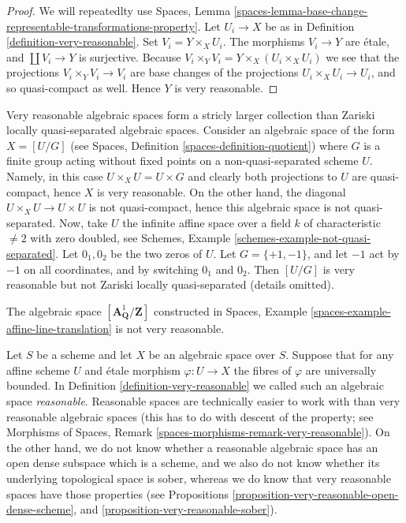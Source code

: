 \begin{proof}
We will repeatedlty use
Spaces, Lemma
\ref{spaces-lemma-base-change-representable-transformations-property}.
Let $U_i \to X$ be as in Definition \ref{definition-very-reasonable}.
Set $V_i = Y \times_X U_i$. The morphisms $V_i \to Y$ are \'etale,
and $\coprod V_i \to Y$ is surjective. Because
$V_i \times_Y V_i = Y \times_X (U_i \times_X U_i)$ we see
that the projections $V_i \times_Y V_i \to V_i$ are
base changes of the projections $U_i \times_X U_i \to U_i$, and so
quasi-compact as well. Hence $Y$ is very reasonable.
\end{proof}

\begin{remark}
\label{remark-very-reasonable-Zariski-locally-quasi-separated}
Very reasonable algebraic spaces form a stricly larger collection than
Zariski locally quasi-separated algebraic spaces. Consider
an algebraic space of the form $X = [U/G]$ (see
Spaces, Definition \ref{spaces-definition-quotient})
where $G$ is a finite group acting without fixed points on a
non-quasi-separated scheme $U$. Namely, in this case
$U \times_X U = U \times G$ and clearly both projections to $U$ are
quasi-compact, hence $X$ is very reasonable. On the other hand, the diagonal
$U \times_X U \to U \times U$ is not quasi-compact, hence this
algebraic space is not quasi-separated. Now, take $U$ the infinite
affine space over a field $k$ of characteristic $\not = 2$ with
zero doubled, see
Schemes, Example \ref{schemes-example-not-quasi-separated}.
Let $0_1, 0_2$ be the two zeros of $U$. Let $G = \{+1, -1\}$, and
let $-1$ act by $-1$ on all coordinates, and by switching
$0_1$ and $0_2$. Then $[U/G]$ is very reasonable but not Zariski locally
quasi-separated (details omitted).
\end{remark}

\begin{example}
\label{example-not-very-reasonable}
The algebraic space $[\mathbf{A}^1_{\mathbf{Q}}/\mathbf{Z}]$ constructed in
Spaces, Example \ref{spaces-example-affine-line-translation}
is not very reasonable.
\end{example}

\begin{remark}
\label{remark-reasonable}
Let $S$ be a scheme and let $X$ be an algebraic space over $S$.
Suppose that for any affine scheme $U$ and \'etale morphism
$\varphi : U \to X$ the fibres of $\varphi$ are universally bounded. In
Definition \ref{definition-very-reasonable}
we called such an algebraic space {\it reasonable}. Reasonable spaces are
technically easier to work with than very reasonable algebraic spaces
(this has to do with descent of the property; see
Morphisms of Spaces, Remark \ref{spaces-morphisms-remark-very-reasonable}).
On the other hand, we do not know whether a reasonable algebraic
space has an open dense subspace which is a scheme, and we also do not know
whether its underlying topological space is sober, whereas we do know that
very reasonable spaces have those properties (see
Propositions \ref{proposition-very-reasonable-open-dense-scheme}, and
\ref{proposition-very-reasonable-sober}).
\end{remark}

